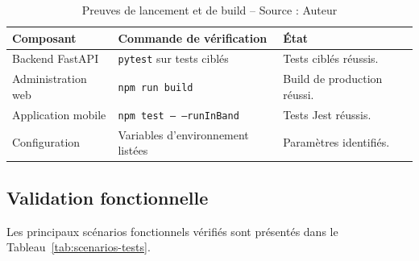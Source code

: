 \begin{table}[H]
    \centering
    \caption{Preuves de lancement et de build -- Source : Auteur}
    \label{tab:preuves-build}
    \begin{tabular}{L{4cm}L{4.8cm}L{4.2cm}}
        \toprule
        \textbf{Composant} & \textbf{Commande de vérification} & \textbf{État} \\
        \midrule
        Backend FastAPI & \texttt{pytest} sur tests ciblés & Tests ciblés réussis. \\
        Administration web & \texttt{npm run build} & Build de production réussi. \\
        Application mobile & \texttt{npm test -- --runInBand} & Tests Jest réussis. \\
        Configuration & Variables d'environnement listées & Paramètres identifiés. \\
        \bottomrule
    \end{tabular}
\end{table}

\subsection{Validation fonctionnelle}

Les principaux scénarios fonctionnels vérifiés sont présentés dans le Tableau~\ref{tab:scenarios-tests}.

